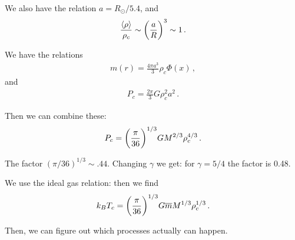 \documentclass[main.tex]{subfiles}
\begin{document}
We also have the relation \(a = R_{\odot} / 5.4\), and 
%
\begin{align}
  \frac{\expval{\rho }}{\rho _c } \sim \qty(\frac{a}{R})^3 
  \sim 1
\,.
\end{align}
%

We have the relations 
%
\begin{align}
  m(r) = \frac{4 \pi a^3}{3} \rho _c \Phi (x)
\,,
\end{align}
%
and 
%
\begin{align}
  P_c = \frac{2 \pi }{3} G \rho_c^2 a^2
\,.
\end{align}

Then we can combine these: 
%
\begin{align}
  P_c = \qty(\frac{\pi }{36})^{1/3} G M^{2/3} \rho _c^{4/3}
\,.
\end{align}

The factor \((\pi / 36)^{1/3} \sim \num{.44}\). 
Changing \(\gamma \) we get: for \(\gamma = 5/4 \) the factor is \num{.48}.

We use the ideal gas relation: then we find 
%
\begin{align}
  k_B T_c = \qty(\frac{\pi }{36 })^{1/3} G \overline{m} M^{1/3} \rho _c^{1/3}
\,.
\end{align}

Then, we can figure out which processes actually can happen. 
\end{document}
